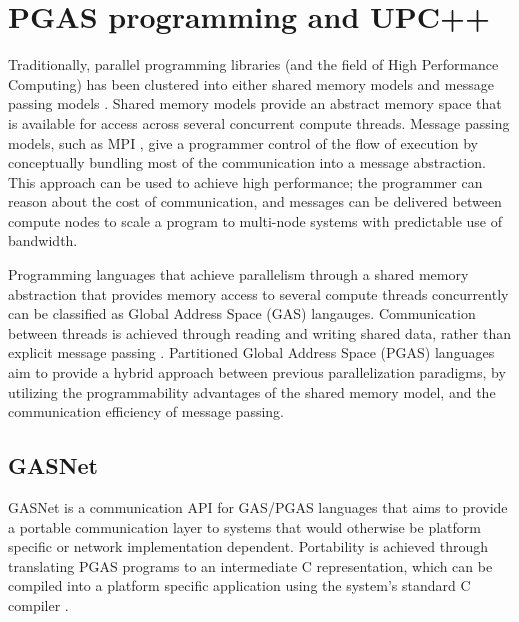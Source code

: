 \documentclass{uit-report}
\begin{document}

\newpage
\chapter{PGAS programming and UPC++}
Traditionally, parallel programming libraries (and the field of High Performance Computing) has been clustered into either shared memory models and message passing models \cite{pgas_languages}. Shared memory models provide an abstract memory space that is available for access across several concurrent compute threads. Message passing models, such as MPI \cite{MPI}, give a programmer control of the flow of execution by conceptually bundling most of the communication into a message abstraction. This approach can be used to achieve high performance; the programmer can reason about the cost of communication, and messages can be delivered between compute nodes to scale a program to multi-node systems with predictable use of bandwidth.


Programming languages that achieve parallelism through a shared memory abstraction that provides memory access to several compute threads concurrently can be classified as Global Address Space (GAS) langauges. Communication between threads is achieved through reading and writing shared data, rather than explicit message passing \cite{gasnet_description}. Partitioned Global Address Space (PGAS) languages aim to provide a hybrid approach between previous parallelization paradigms, by utilizing the programmability advantages of the shared memory model, and the communication efficiency of message passing.

\section{GASNet}
GASNet is a communication API for GAS/PGAS languages that aims to provide a portable communication layer to systems that would otherwise be platform specific or network implementation dependent. Portability is achieved through translating PGAS programs to an intermediate C representation, which can be compiled into a platform specific application using the system's standard C compiler \cite{gasnet_description}.
\end{document}
